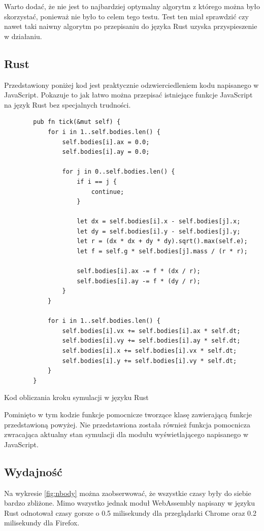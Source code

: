 \documentclass[language=polish,type=master]{aghmodern}
\begin{document}
Warto dodać, że nie jest to najbardziej optymalny algorytm z którego można było skorzystać, ponieważ nie było to celem tego testu.
Test ten miał sprawdzić czy nawet taki naiwny algorytm po przepisaniu do języka Rust uzyska przyspieszenie w działaniu.

\subsection{Rust}
Przedstawiony poniżej kod jest praktycznie odzwierciedleniem kodu napisanego w JavaScript.
Pokazuje to jak łatwo można przepisać istniejące funkcje JavaScript na język Rust bez specjalnych trudności.

\begin{listing}[H]
    \begin{verbatim}
        pub fn tick(&mut self) {
            for i in 1..self.bodies.len() {
                self.bodies[i].ax = 0.0;
                self.bodies[i].ay = 0.0;
    
                for j in 0..self.bodies.len() {
                    if i == j {
                        continue;
                    }
    
                    let dx = self.bodies[i].x - self.bodies[j].x;
                    let dy = self.bodies[i].y - self.bodies[j].y;
                    let r = (dx * dx + dy * dy).sqrt().max(self.e);
                    let f = self.g * self.bodies[j].mass / (r * r);
    
                    self.bodies[i].ax -= f * (dx / r);
                    self.bodies[i].ay -= f * (dy / r);
                }
            }
    
            for i in 1..self.bodies.len() {
                self.bodies[i].vx += self.bodies[i].ax * self.dt;
                self.bodies[i].vy += self.bodies[i].ay * self.dt;
                self.bodies[i].x += self.bodies[i].vx * self.dt;
                self.bodies[i].y += self.bodies[i].vy * self.dt;
            }
        }
    \end{verbatim}
    \caption{Kod obliczania kroku symulacji w języku Rust}
\end{listing}

Pominięto w tym kodzie funkcje pomocnicze tworzące klasę zawierającą funkcje przedstawioną powyżej.
Nie przedstawiona została również funkcja pomocnicza zwracająca aktualny stan symulacji dla modułu wyświetlającego napisanego w JavaScript.

\subsection{Wydajność}
Na wykresie \ref{fig:nbody} można zaobserwować, że wszystkie czasy były do siebie bardzo zbliżone.
Mimo wszystko jednak moduł WebAssembly napisany w języku Rust odnotował czasy gorsze o 0.5 milisekundy dla przeglądarki Chrome oraz 0.2 milisekundy dla Firefox.
\end{document}
